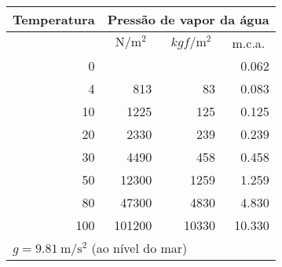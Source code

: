 \begin{table}[H]
	\centering
	\begin{tabular}{|r|r|r|r|}
		\hline
		\multicolumn{1}{|c|}{Temperatura} & \multicolumn{3}{c|}{Pressão de vapor da água} \\ \hline
		\multicolumn{1}{|c|}{\SI{}{\SIUnitSymbolCelsius}} &
		\multicolumn{1}{c|}{$\SI{}{\newton/\meter^{2}}$} &
		\multicolumn{1}{c|}{$\SI{}{kgf/\meter^{2}}$} &
		\multicolumn{1}{c|}{m.c.a.} \\ \hline
		0                                 &                &              & 0.062         \\ \hline
		4                                 & 813            & 83           & 0.083         \\ \hline
		10                                & 1225           & 125          & 0.125         \\ \hline
		20                                & 2330           & 239          & 0.239         \\ \hline
		30                                & 4490           & 458          & 0.458         \\ \hline
		50                                & 12300          & 1259         & 1.259         \\ \hline
		80                                & 47300          & 4830         & 4.830         \\ \hline
		100                               & 101200         & 10330        & 10.330        \\ \hline
		\multicolumn{4}{|l|}{$g=\SI{9.81}{\meter/\second^{2}}$ (ao nível do mar)}         \\ \hline
	\end{tabular}
\end{table}